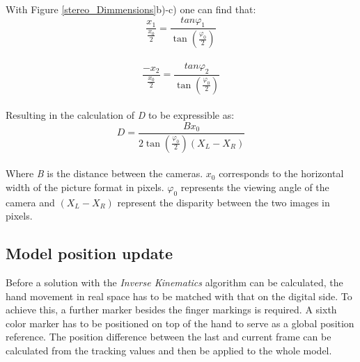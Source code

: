 With Figure \ref{stereo_Dimmensions}b)-c) one can find that:
\begin{equation}
\frac{x_{1}}{\frac{x_{0}}{2}}=\frac{tan \varphi_1}{\tan(\frac{\varphi_{0}}{2})}
\end{equation}\\
\begin{equation}
\frac{-x_{2}}{\frac{x_{0}}{2}}=\frac{tan \varphi_2}{\tan(\frac{\varphi_{0}}{2})}
\end{equation}\\
Resulting in the calculation of \textit{D} to be expressible as:
\begin{equation}
D=\frac{Bx_0}{2\tan(\frac{\varphi_0}{2})(X_{L}-X_{R})}
\end{equation}\\
Where \textit{B} is the distance between the cameras. $x_0$ corresponds to the horizontal width of the picture format in pixels. $\varphi_0$ represents the viewing angle of the camera and $(X_{L}-X_{R})$ represent the disparity between the two images in pixels.
\subsection{Model position update}
Before a solution with the \textit{Inverse Kinematics} algorithm can be calculated, the hand movement in real space has to be matched with that on the digital side. To achieve this, a further marker besides the finger markings is required. A sixth color marker has to be positioned on top of the hand to serve as a global position reference. The position difference between the last and current frame can be calculated from the tracking values and then be applied to the whole model.
